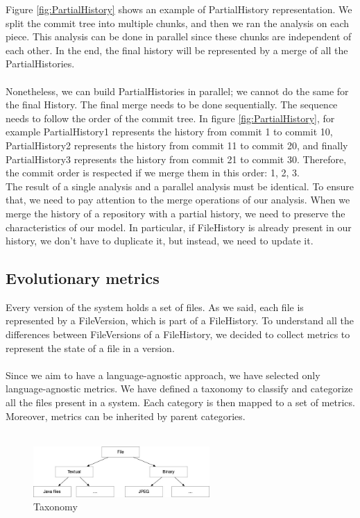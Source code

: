 Figure \ref{fig:PartialHistory} shows an example of PartialHistory representation. 
We split the commit tree into multiple chunks, and then we ran the analysis on each piece. 
This analysis can be done in parallel since these chunks are independent of each other. 
In the end, the final history will be represented by a merge of all the PartialHistories. \\
\\
Nonetheless, we can build PartialHistories in parallel; we cannot do the same for the final History. 
The final merge needs to be done sequentially. The sequence needs to follow the order of the commit tree. 
In figure \ref{fig:PartialHistory}, for example
PartialHistory1 represents the history from commit 1 to commit 10, 
PartialHistory2 represents the history from commit 11 to commit 20, and finally 
PartialHistory3 represents the history from commit 21 to commit 30.
Therefore, the commit order is respected if we merge them in this order: 1, 2, 3. 
\\
The result of a single analysis and a parallel analysis must be identical. 
To ensure that, we need to pay attention to the merge operations of our analysis.
When we merge the history of a repository with a partial history, we need to preserve the characteristics of our model. 
In particular, if FileHistory is already present in our history, we don't have to duplicate it, but instead, we need to update it. 

\subsection*{Evolutionary metrics}
Every version of the system holds a set of files. 
As we said, each file is represented by a FileVersion, which is part of a FileHistory. 
To understand all the differences between FileVersions of a FileHistory,
we decided to collect metrics to represent the state of a file in a version.\\
\\
Since we aim to have a language-agnostic approach, we have selected only language-agnostic metrics. 
We have defined a taxonomy to classify and categorize all the files present in a system. 
Each category is then mapped to a set of metrics. Moreover, metrics can be inherited by parent categories. \\
\\


\begin{figure}
    \center
    \includegraphics[width=0.6\textwidth]{Taxonomy.jpg}
    \caption{Taxonomy}
    \label{fig:taxonomy}
\end{figure}

